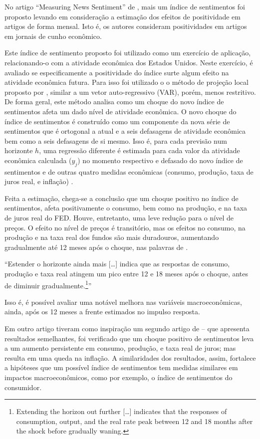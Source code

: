 No artigo ``Measuring News Sentiment'' de , mais um índice de sentimentos foi proposto levando em consideração a estimação dos efeitos de positividade em artigos de forma mensal. Isto é, os autores consideram positividades em artigos em jornais de cunho econômico. 

Este índice de sentimento proposto foi utilizado como um exercício de aplicação, relacionando-o com a atividade econômica dos Estados Unidos. Neste exercício, é avaliado se especificamente a positividade do índice surte algum efeito na atividade econômica futura. Para isso foi utilizado o o método de projeção local proposto por , similar a um vetor auto-regressivo (VAR), porém, menos restritivo. De forma geral, este método analisa como um choque do novo índice de sentimentos afeta um dado nível de atividade econômica. O novo choque do índice de sentimentos é construído como um componente da nova série de sentimentos que é ortogonal a atual e a seis defasagens de atividade econômica bem como a seis defasagens de si mesmo. Isso é, para cada previsão num horizonte $h$, uma regressão diferente é estimada para cada valor da atividade econômica calculada ($y_j$) no momento respectivo e defasado do novo índice de sentimentos e de outras quatro medidas econômicas (consumo, produção, taxa de juros real, e inflação) \cite{shapiro2018measuring}.

Feita a estimação, chega-se a conclusão que um choque positivo no índice de sentimentos, afeta positivamente o consumo, bem como na produção, e na taxa de juros real do FED. Houve, entretanto, uma leve redução para o nível de preços. O efeito no nível de preços é transitório, mas os efeitos no consumo, na produção e na taxa real dos fundos são mais duradouros, aumentando gradualmente até 12 meses após o choque, nas palavras de .


\begin{citacao}
``Estender o horizonte ainda mais [\dots] indica que as respostas de consumo, produção e taxa real atingem um pico entre 12 e 18 meses após o choque, antes de diminuir gradualmente.\footnote{Extending the horizon out further [\dots] indicates that the responses of consumption, output, and the real rate peak between 12 and 18 months after the shock before gradually waning.}'' \cite[p.19-20]{shapiro2018measuring}
\end{citacao}

Isso é, é possível avaliar uma notável melhora nas variáveis macroeconômicas, ainda, após os 12 meses a frente estimados no impulso resposta.

Em outro artigo  tiveram como inspiração um segundo artigo de  -- que apresenta resultados semelhantes, foi verificado que um choque positivo de sentimentos leva a um aumento persistente em consumo, produção, e taxa real de juros; mas resulta em uma queda na inflação. A similaridades dos resultados, assim, fortalece a hipóteses que um possível índice de sentimentos tem medidas similares em impactos macroeconômicos, como por exemplo, o índice de sentimentos do consumidor.
